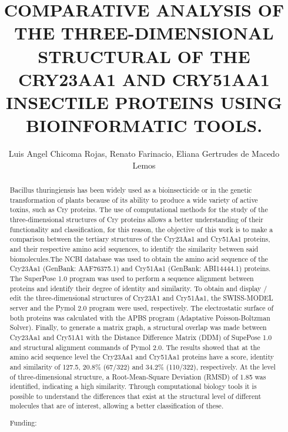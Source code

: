 \documentclass[twoside]{article}
\title{\vspace{-15mm}\fontsize{24pt}{10pt}\selectfont\textbf{ COMPARATIVE ANALYSIS OF THE THREE-DIMENSIONAL STRUCTURAL OF THE CRY23AA1 AND CRY51AA1 INSECTILE PROTEINS USING BIOINFORMATIC TOOLS. }} %
\author{ Luis Angel Chicoma Rojas, Renato Farinacio, Eliana Gertrudes de Macedo Lemos }
\affil{ Private University Antenor Orrego \& Paulista State University,  Jaboticabal Campus }
\date{}
\begin{document}
  
  
  \maketitle %
  
  
  \thispagestyle{fancy} %
  
  
  \begin{abstract}
  Bacillus thuringiensis has been widely used as a bioinsecticide or in the genetic transformation of plants because of its ability to produce a wide variety of active toxins,  such as Cry proteins. The use of computational methods for the study of the three-dimensional structures of Cry proteins allows a better understanding of their functionality and classification,  for this reason,  the objective of this work is to make a comparison between the tertiary structures of the Cry23Aa1 and Cry51Aa1 proteins,  and their respective amino acid sequences,  to identify the similarity between said biomolecules.The NCBI database was used to obtain the amino acid sequence of the Cry23Aa1 (GenBank: AAF76375.1) and Cry51Aa1 (GenBank: ABI14444.1) proteins. The SuperPose 1.0 program was used to perform a sequence alignment between proteins and identify their degree of identity and similarity. To obtain and display / edit the three-dimensional structures of Cry23A1 and Cry51Aa1,  the SWISS-MODEL server and the Pymol 2.0 program were used,  respectively. The electrostatic surface of both proteins was calculated with the APBS program (Adaptative Poisson-Boltzman Solver). Finally,  to generate a matrix graph,  a structural overlap was made between Cry23Aa1 and Cry51A1 with the Distance Difference Matrix (DDM) of SupePose 1.0 and structural alignment commands of Pymol 2.0. The results showed that at the amino acid sequence level the Cry23Aa1 and Cry51Aa1 proteins have a score,  identity and similarity of 127.5,  20.8\% (67/322) and 34.2\% (110/322),  respectively. At the level of three-dimensional structure,  a Root-Mean-Square Deviation (RMSD) of 1.85 was identified,  indicating a high similarity. Through computational biology tools it is possible to understand the differences that exist at the structural level of different molecules that are of interest,  allowing a better classification of these.
  
  Funding:  \\ 
  \end{abstract}
  
\end{document}
